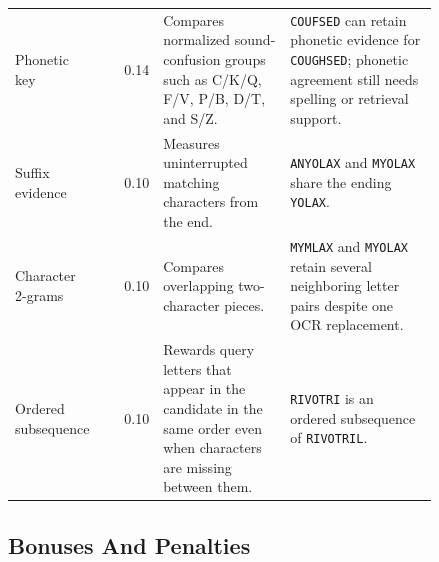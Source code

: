 \documentclass[11pt,a4paper]{article}
\newcommand{\code}[1]{\texttt{#1}}
\begin{document}
\begin{longtable}{@{}L{0.19\linewidth}rL{0.30\linewidth}L{0.35\linewidth}@{}}
Phonetic key & 0.14 & Compares normalized sound-confusion groups such as C/K/Q, F/V, P/B, D/T, and S/Z. & \code{COUFSED} can retain phonetic evidence for \code{COUGHSED}; phonetic agreement still needs spelling or retrieval support. \\
Suffix evidence & 0.10 & Measures uninterrupted matching characters from the end. & \code{ANYOLAX} and \code{MYOLAX} share the ending \code{YOLAX}. \\
Character 2-grams & 0.10 & Compares overlapping two-character pieces. & \code{MYMLAX} and \code{MYOLAX} retain several neighboring letter pairs despite one OCR replacement. \\
Ordered subsequence & 0.10 & Rewards query letters that appear in the candidate in the same order even when characters are missing between them. & \code{RIVOTRI} is an ordered subsequence of \code{RIVOTRIL}. \\
\bottomrule
\end{longtable}
\normalsize

\subsection{Bonuses And Penalties}
\end{document}
